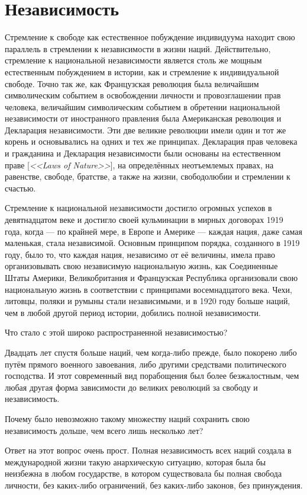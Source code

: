 \chapter{Независимость}

Стремление к свободе как естественное побуждение индивидуума находит свою параллель в стремлении к независимости в жизни наций. Действительно, стремление к национальной независимости является столь же мощным естественным побуждением в истории, как и стремление к индивидуальной свободе. Точно так же, как Французская революция была величайшим символическим событием в освобождении личности и провозглашении прав человека, величайшим символическим событием в обретении национальной независимости от иностранного правления была Американская революция и Декларация независимости. Эти две великие революции имели один и тот же корень и основывались на одних и тех же принципах. Декларация прав человека и гражданина и Декларация независимости были основаны на естественном праве [\textit{<<Laws of Nature>>}], на определённых неотъемлемых правах, на равенстве, свободе, братстве, а также на жизни, свободолюбии и стремлении к счастью.
 
Стремление к национальной независимости достигло огромных успехов в девятнадцатом веке и достигло своей кульминации в мирных договорах 1919 года, когда — по крайней мере, в Европе и Америке — каждая нация, даже самая маленькая, стала независимой. Основным принципом порядка, созданного в 1919 году, было то, что каждая нация, независимо от её величины, имела право организовывать свою независимую национальную жизнь, как Соединенные Штаты Америки, Великобритания и Французская Республика организовали свою национальную жизнь в соответствии с принципами восемнадцатого века. Чехи, литовцы, поляки и румыны стали независимыми, и в 1920 году больше наций, чем в любой другой период истории, добились полной независимости.

Что стало с этой широко распространенной независимостью?

Двадцать лет спустя больше наций, чем когда-либо прежде, было покорено либо путём прямого военного завоевания, либо другими средствами политического господства. И этот современный вид порабощения был более безжалостным, чем любая другая форма зависимости до великих революций за свободу и независимость.

Почему было невозможно такому множеству наций сохранить свою независимость дольше, чем всего лишь несколько лет?

Ответ на этот вопрос очень прост. Полная независимость всех наций создала в международной жизни такую анархическую ситуацию, которая была бы неизбежна в любом государстве, в котором существовала бы полная свобода личности, без каких-либо ограничений, без каких-либо законов, без принуждения.

